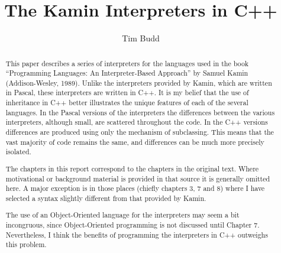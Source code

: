 \documentclass[10pt,twoside,a4paper]{report}
\begin{document}
\title{The Kamin Interpreters in C++}
\author{Tim Budd}
\maketitle
\cleardoublepage

\begin{abstract}
    This paper describes a series of interpreters for the languages used in the
    book ``Programming Languages: An Interpreter-Based Approach'' by Samuel
    Kamin (Addison-Wesley, 1989).  Unlike the interpreters provided by Kamin,
    which are written in Pascal, these interpreters are written in C++.  It is
    my belief that the use of inheritance in C++ better illustrates the unique
    features of each of the several languages.  In the Pascal versions of the
    interpreters the differences between the various interpreters, although
    small, are scattered throughout the code.  In the C++ versions differences
    are produced using only the mechanism of subclassing.  This means that the
    vast majority of code remains the same, and differences can be much more
    precisely isolated.

    The chapters in this report correspond to the chapters in the original text.
    Where motivational or background material is provided in that source it is
    generally omitted here.  A major exception is in those places (chiefly
    chapters 3, 7 and 8) where I have selected a syntax slightly different from
    that provided by Kamin.

    The use of an Object-Oriented language for the interpreters may seem a bit
    incongruous, since Object-Oriented programming is not discussed until
    Chapter 7.  Nevertheless, I think the benefits of programming the
    interpreters in C++ outweighs this problem.
\end{abstract}

\tableofcontents
\listoffigures
\lstlistoflistings











\end{document}
